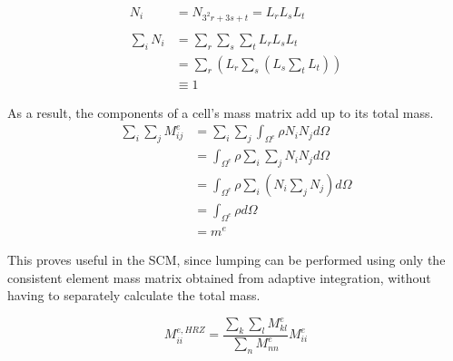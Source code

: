 \begin{equation}
\begin{array}{ll}
	N_i &= N_{3^2r + 3s + t} = L_r L_s L_t \\
	\\
	\sum_i N_i
	&= \sum_r \sum_s \sum_t L_r L_s L_t	\\
	&= \sum_r
	\left(
		L_r \sum_s
		\left(
			L_s \sum_t L_t
		\right)
	\right) \\
	& \equiv 1
\end{array}
\end{equation}


As a result, the components of a cell's mass matrix add up to its total mass.
\begin{equation}
\begin{aligned}
	\sum_i \sum_j M_{ij}^e &= \sum_i \sum_j \int_{\Omega^e} \rho N_i N_j d\Omega \\
	&= \int_{\Omega^e} \rho \sum_i \sum_j N_i N_j d\Omega \\
	&= \int_{\Omega^e} \rho \sum_i
	\left(
		N_i \sum_j N_j
	\right)
	d\Omega \\
	&= \int_{\Omega^e} \rho d\Omega \\
	&= m^e
\end{aligned}
\end{equation}

This proves useful in the SCM, since lumping can be performed using only the consistent
element mass matrix obtained from adaptive integration, without having to separately
calculate the total mass.

\begin{equation}
	M_{ii}^{e,HRZ} =
	\frac{\sum_k \sum_l M_{kl}^e}{\sum_n M_{nn}^e} M_{ii}^e
\end{equation}